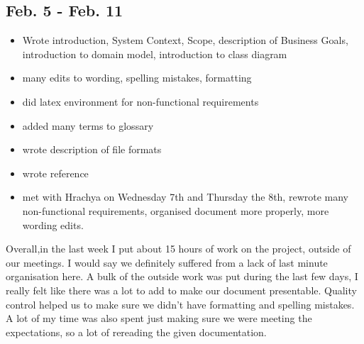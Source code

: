 \documentclass[12pt]{article}
\begin{document}
\subsection*{Feb. 5 - Feb. 11}
\begin{itemize}
    \item Wrote introduction, System Context, Scope, description of Business Goals, introduction to domain model, introduction to class diagram
    \item many edits to wording, spelling mistakes, formatting
    \item did latex environment for non-functional requirements
    \item added many terms to glossary
    \item wrote description of file formats
    \item wrote reference
    \item met with Hrachya on Wednesday 7th and Thursday the 8th, rewrote many non-functional requirements, organised document more properly, more wording edits.
\end{itemize}

Overall,in the last week I put about 15 hours of work on the project, outside of our meetings. I would say we definitely suffered from a lack of last minute organisation here. A bulk of the outside work was put during the last few days, I really felt like there was a lot to add to make our document presentable. Quality control helped us to make sure we didn't have formatting and spelling mistakes. A lot of my time was also spent just making sure we were meeting the expectations, so a lot of rereading the given documentation.
\end{document}

